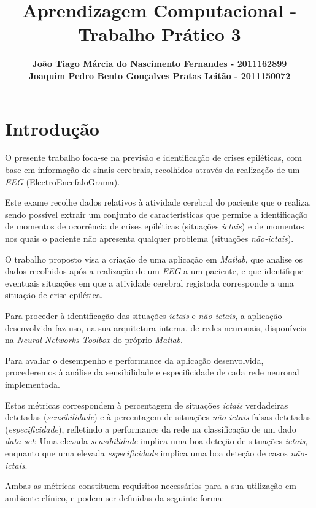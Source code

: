 \documentclass{article}
\title{\bf{Aprendizagem Computacional - Trabalho Prático 3}\vspace{80mm}}
\author{\textbf{João Tiago Márcia do Nascimento Fernandes - 2011162899} \\
\textbf{Joaquim Pedro Bento Gonçalves Pratas Leitão - 2011150072}}
\begin{document}
\maketitle

\pagebreak

\renewcommand*\contentsname{Índice}
\tableofcontents

\pagebreak

\section{Introdução}

O presente trabalho foca-se na previsão e identificação de crises epiléticas, com base em informação de sinais cerebrais, recolhidos através da realização de um \emph{EEG} (ElectroEncefaloGrama).

Este exame recolhe dados relativos à atividade cerebral do paciente que o realiza, sendo possível extrair um conjunto de características que permite a identificação de momentos de ocorrência de crises epiléticas (situações \emph{ictais}) e de momentos nos quais o paciente não apresenta qualquer problema (situações \emph{não-ictais}).

O trabalho proposto visa a criação de uma aplicação em \emph{Matlab}, que analise os dados recolhidos após a realização de um \emph{EEG} a um paciente, e que identifique eventuais situações em que a atividade cerebral registada corresponde a uma situação de crise epilética.

Para proceder à identificação das situações \emph{ictais} e \emph{não-ictais}, a aplicação desenvolvida faz uso, na sua arquitetura interna, de redes neuronais, disponíveis na \emph{Neural Networks Toolbox} do próprio \emph{Matlab}.

Para avaliar o desempenho e performance da aplicação desenvolvida, procederemos à análise da sensibilidade e especificidade de cada rede neuronal implementada.

Estas métricas correspondem à percentagem de situações \emph{ictais} verdadeiras detetadas (\emph{sensibilidade}) e à percentagem de situações \emph{não-ictais} falsas detetadas (\emph{especificidade}), refletindo a performance da rede na classificação de um dado \emph{data set}: Uma elevada \emph{sensibilidade} implica uma boa deteção de situações \emph{ictais}, enquanto que uma elevada \emph{especificidade} implica uma boa deteção de casos \emph{não-ictais}.

Ambas as métricas constituem requisitos necessários para a sua utilização em ambiente clínico, e podem ser definidas da seguinte forma:
\end{document}
